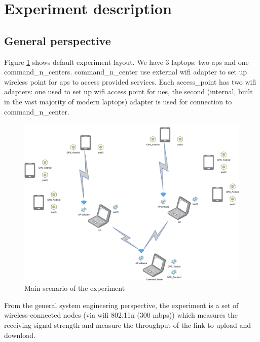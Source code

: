 
\section{Experiment description}\label{experiment-description}

\subsection{General perspective}\label{general-perspective}

Figure \ref{fig:experiment-overall-layout} shows default experiment layout. We have 3 laptops: two \glspl{ap} and one \glspl{command_n_center}. \Gls{command_n_center} use external \gls{wifi} adapter to set up wireless point for \glspl{ap} to access provided services. Each \acrshort{access_point} has two \gls{wifi} adapters: one used to set up \gls{wifi} access point for \glspl{ue}, the second (internal, built in the vast majority of modern laptops) adapter is used for connection to \gls{command_n_center}.

\begin{figure}[H]
\centering
\includegraphics[width=\linewidth,keepaspectratio]{images/Deployment Diagram-Free-structure_scheme.pdf}
\caption{Main scenario of the experiment}
\label{fig:experiment-overall-layout}
\end{figure}

From the general system engineering perspective, the experiment is a set
of wireless-connected nodes (via \gls{wifi} 802.11n (300 mbps)) which measures the receiving signal strength and measure the throughput of the link to upload and download.

